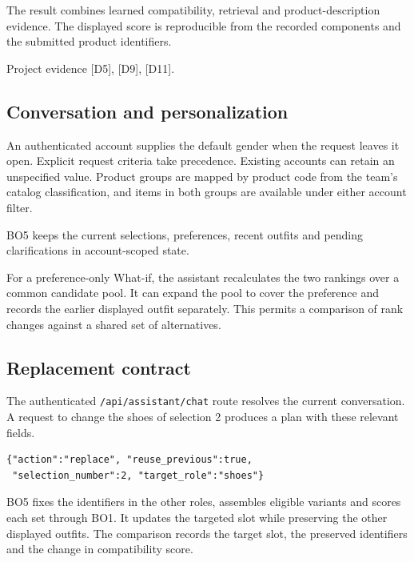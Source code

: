 \documentclass[11pt,a4paper]{article}
\newcommand{\src}[1]{\par{\footnotesize\textcolor{muted}{Project evidence #1.}}\par}
\newcommand{\file}[1]{\nolinkurl{#1}}
\begin{document}
The result combines learned compatibility, retrieval and product-description evidence. The displayed score is reproducible from the recorded components and the submitted product identifiers.
\src{[D5], [D9], [D11]}

\clearpage
\subsection*{Conversation and personalization}
An authenticated account supplies the default gender when the request leaves it open. Explicit request criteria take precedence. Existing accounts can retain an unspecified value. Product groups are mapped by product code from the team's catalog classification, and items in both groups are available under either account filter.

BO5 keeps the current selections, preferences, recent outfits and pending clarifications in account-scoped state.

For a preference-only What-if, the assistant recalculates the two rankings over a common candidate pool. It can expand the pool to cover the preference and records the earlier displayed outfit separately. This permits a comparison of rank changes against a shared set of alternatives.

\subsection*{Replacement contract}
The authenticated \file{/api/assistant/chat} route resolves the current conversation. A request to change the shoes of selection 2 produces a plan with these relevant fields.

\begin{verbatim}
{"action":"replace", "reuse_previous":true,
 "selection_number":2, "target_role":"shoes"}
\end{verbatim}

BO5 fixes the identifiers in the other roles, assembles eligible variants and scores each set through BO1. It updates the targeted slot while preserving the other displayed outfits. The comparison records the target slot, the preserved identifiers and the change in compatibility score.
\end{document}
